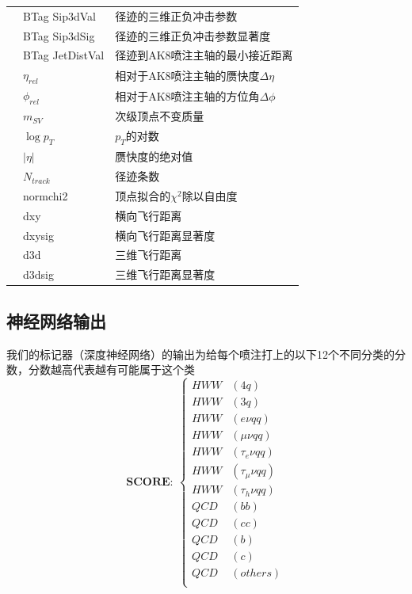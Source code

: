 \begin{table}[htbp]
\begin{tabular}{>{\centering\arraybackslash}p{2.5cm}%
    >{\centering\arraybackslash}p{3cm}%
    >{\centering\arraybackslash}p{9cm}}
    & BTag Sip3dVal & 径迹的三维正负冲击参数\\
    & BTag Sip3dSig & 径迹的三维正负冲击参数显著度\\
    & BTag JetDistVal & 径迹到AK8喷注主轴的最小接近距离\\
    \midrule
    \multirow{11}{*}{次级顶点} & $\eta_{rel}$ & 相对于AK8喷注主轴的赝快度$\Delta \eta$\\
    & $\phi_{rel}$ & 相对于AK8喷注主轴的方位角$\Delta \phi$\\
    & $m_{SV}$ & 次级顶点不变质量\\
    & $\log{p_T}$ & $p_T$的对数\\
    & $|\eta|$ & 赝快度的绝对值\\
    & $N_{track}$ & 径迹条数\\
    & normchi2 & 顶点拟合的$\chi^2$除以自由度\\
    & dxy & 横向飞行距离\\
    & dxysig & 横向飞行距离显著度\\
    & d3d & 三维飞行距离\\
    & d3dsig & 三维飞行距离显著度\\
    \bottomrule\bottomrule
\end{tabular}
\end{table}

\subsection{神经网络输出}
我们的标记器（深度神经网络）的输出为给每个喷注打上的以下12个不同分类的分数，分数越高代表越有可能属于这个类
\begin{equation*}
    \textbf{SCORE}:\ \left\{
    \begin{aligned}
    HWW&(4q)\\
    HWW&(3q)\\
    HWW&(e\nu qq)\\
    HWW&(\mu\nu qq)\\
    HWW&(\tau_e\nu qq)\\
    HWW&(\tau_\mu\nu qq)\\
    HWW&(\tau_h\nu qq)\\
    QCD&(bb)\\
    QCD&(cc)\\
    QCD&(b)\\
    QCD&(c)\\
    QCD&(others)\\
    \end{aligned}
    \right.
\end{equation*}

